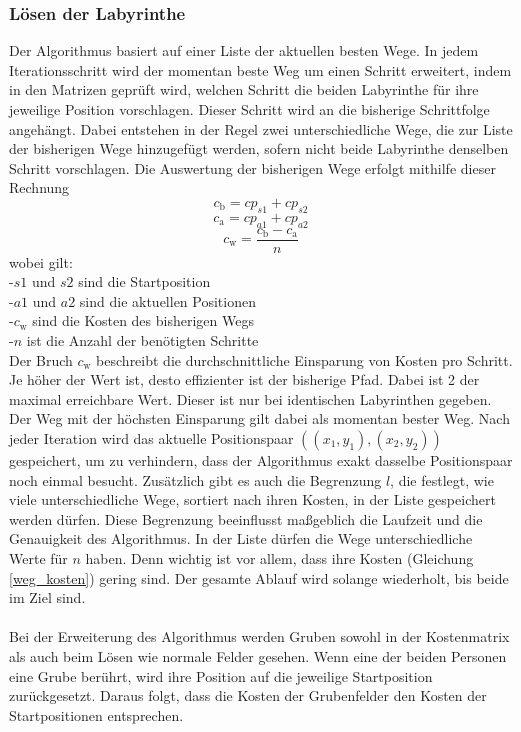 \documentclass[a4paper,12pt,ngerman]{scrartcl}
\begin{document}
\subsubsection{Lösen der Labyrinthe}
Der Algorithmus basiert auf einer Liste der aktuellen besten Wege.
In jedem Iterationsschritt wird der momentan beste Weg um einen Schritt erweitert, 
indem in den Matrizen geprüft wird, welchen Schritt die beiden Labyrinthe für ihre jeweilige Position vorschlagen.
Dieser Schritt wird an die bisherige Schrittfolge angehängt.
Dabei entstehen in der Regel zwei unterschiedliche Wege, die zur Liste der bisherigen Wege hinzugefügt werden, 
sofern nicht beide Labyrinthe denselben Schritt vorschlagen.
Die Auswertung der bisherigen Wege erfolgt mithilfe dieser Rechnung 
\\
\begin{equation}
  c_\text{b} = cp_{s1} + cp_{s2}
\end{equation}
\begin{equation}
  c_\text{a} = cp_{a1} + cp_{a2}
\end{equation}
\begin{equation}
  c_\text{w} = \frac{c_\text{b} -c_\text{a}}{n}
  \label{weg_kosten}
\end{equation}
wobei gilt:\\
-$s1$ und $s2$ sind die Startposition\\
-$a1$ und $a2$ sind die aktuellen Positionen\\
-$c_\text{w}$ sind die Kosten des bisherigen Wegs\\
-$n$ ist die Anzahl der benötigten Schritte\\
Der Bruch $c_\text{w}$ beschreibt die durchschnittliche Einsparung von Kosten pro Schritt.
Je höher der Wert ist, desto effizienter ist der bisherige Pfad. 
Dabei ist 2 der maximal erreichbare Wert. Dieser ist nur bei identischen Labyrinthen gegeben.
\\
Der Weg mit der höchsten Einsparung gilt dabei als momentan bester Weg.
Nach jeder Iteration wird das aktuelle Positionspaar $((x_1, y_1),(x_2, y_2))$ gespeichert,
um zu verhindern, dass der Algorithmus exakt dasselbe Positionspaar noch einmal besucht.
Zusätzlich gibt es auch die Begrenzung $l$, die festlegt, wie viele unterschiedliche Wege, sortiert nach ihren Kosten, in der Liste gespeichert werden dürfen.
Diese Begrenzung beeinflusst maßgeblich  die Laufzeit und die Genauigkeit des Algorithmus.
In der Liste dürfen die Wege unterschiedliche Werte für $n$ haben.
Denn wichtig ist vor allem, dass ihre Kosten (Gleichung \eqref{weg_kosten}) gering sind.
Der gesamte Ablauf wird solange wiederholt, bis beide im Ziel sind.
\\
\\
Bei der Erweiterung des Algorithmus werden Gruben sowohl in der Kostenmatrix als auch beim Lösen wie normale Felder gesehen. 
Wenn eine der beiden Personen eine Grube berührt, wird ihre Position auf die jeweilige Startposition zurückgesetzt.
Daraus folgt, dass die Kosten der Grubenfelder den Kosten der Startpositionen entsprechen.
\end{document}
